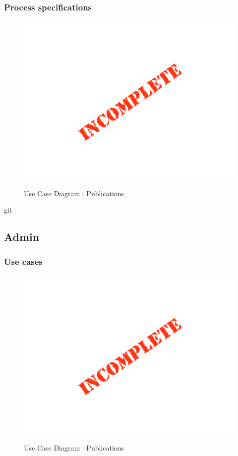 \documentclass{article}
\begin{document}
		\subsubsection{Process specifications}

		\begin{figure}[H]
		\includegraphics[width=\textwidth]{images/Incomplete.png}  \\
		\caption{Use Case Diagram : Publications}
		\end{figure}git 


	\subsection{Admin}

	\subsubsection{Use cases}

	\begin{figure}[H]
	\includegraphics[width=\textwidth]{images/Incomplete.png}  \\
	\caption{Use Case Diagram : Publications}
	\end{figure}
\end{document}
